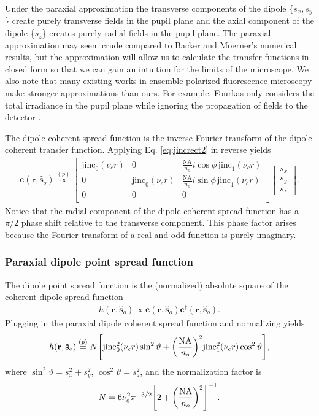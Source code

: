 \documentclass[]{osa-article}
\let\originalleft\left
\let\originalright\right
\renewcommand{\left}{\mathopen{}\mathclose\bgroup\originalleft}
\renewcommand{\right}{\aftergroup\egroup\originalright}
\providecommand{\mb}[1]{\mathbf{#1}}
\providecommand{\so}{\mathbf{\hat{s}}_o}
\begin{document}
 Under the paraxial approximation the transverse components of the dipole
 \{$s_x, s_y$\} create purely transverse fields in the pupil plane and the axial
 component of the dipole \{$s_z$\} creates purely radial fields in the pupil
 plane. The paraxial approximation may seem crude compared to Backer and
 Moerner's numerical results, but the approximation will allow us to calculate
 the transfer functions in closed form so that we can gain an intuition for the
 limits of the microscope. We also note that many existing works in ensemble
 polarized fluorescence microscopy make stronger approximations than ours. For
 example, Fourkas only considers the total irradiance in the pupil plane while
 ignoring the propagation of fields to the detector \cite{fourkas2001}.

 The dipole coherent spread function is the inverse Fourier transform of the
 dipole coherent transfer function. Applying Eq. \eqref{eq:jincrect2} in reverse
 yields
  \begin{align}
   \mb{c}(\mb{r}, \so) \stackrel{(p)}{\propto}
   \begin{bmatrix}
     \text{jinc}_0(\nu_c r)&0&\frac{\text{NA}}{n_o}i\cos\phi\,\text{jinc}_1(\nu_c r)\\
     0&\text{jinc}_0(\nu_c r)&\frac{\text{NA}}{n_o}i\sin\phi\,\text{jinc}_1(\nu_c r)\\
     0&0&0\\     
   \end{bmatrix}
   \begin{bmatrix}
     s_x\\
     s_y\\
     s_z
   \end{bmatrix}.
  \end{align}
  Notice that the radial component of the dipole coherent spread function has a
  $\pi/2$ phase shift relative to the transverse component. This phase factor
  arises because the Fourier transform of a real and odd function is purely
  imaginary.
  
  \subsubsection{Paraxial dipole point spread function}
  The dipole point spread function is the (normalized) absolute square of the
coherent dipole spread function
\begin{align}
  h(\mb{r}, \so) \propto \mb{c}(\mb{r}, \so)\mb{c}^\dagger(\mb{r}, \so). 
\end{align}
Plugging in the paraxial dipole coherent spread function and normalizing yields
\begin{align}
  h(\mb{r}, \so) \stackrel{(p)}{=} N\left[\text{jinc}_0^2(\nu_c r)\sin^2\vartheta + \left(\frac{\text{NA}}{n_o}\right)^2\text{jinc}_1^2(\nu_c r)\cos^2\vartheta\right],\label{eq:paradpsf}
\end{align}
where $\sin^2\vartheta = s_x^2 + s_y^2$, $\cos^2\vartheta = s_z^2$, and the normalization factor is
\begin{align}
  N = 6\nu_c^2\pi^{-3/2}\left[2 + \left(\frac{\text{NA}}{n_o}\right)^2\right]^{-1}.
\end{align}
\end{document}
